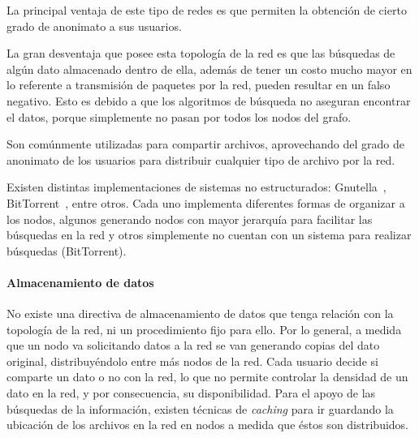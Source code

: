 La principal ventaja de este tipo de redes es que permiten la obtención de
cierto grado de anonimato a sus usuarios.

La gran desventaja que posee esta topología de la red es que las búsquedas de
algún dato almacenado dentro de ella, además de tener un costo mucho mayor en lo
referente a transmisión de paquetes por la red, pueden resultar en un falso
negativo. Esto es debido a que los algoritmos de búsqueda no aseguran encontrar
el datos, porque simplemente no pasan por todos los nodos del grafo.


Son comúnmente utilizadas para compartir archivos, aprovechando del grado de
anonimato de los usuarios para distribuir cualquier tipo de archivo por la red.

Existen distintas implementaciones de sistemas no estructurados:
Gnutella~\cite{oai:CiteSeerXPSU:10.1.1.61.7302}, 
BitTorrent~\cite{bittorrent}, 
entre otros. Cada uno implementa diferentes
formas de organizar a los nodos, algunos generando nodos con mayor jerarquía
para facilitar las búsquedas en la red y otros simplemente no cuentan con un
sistema para realizar búsquedas (BitTorrent).

\paragraph{Almacenamiento de datos}
\label{sec:p2p_unstructured_storage}

No existe una directiva de almacenamiento de datos que tenga relación con la
topología de la red, ni un procedimiento fijo para ello. Por lo general, a medida que un nodo va solicitando
datos a la red se van generando copias del dato original, distribuyéndolo
entre más nodos de la red. Cada usuario decide si comparte un dato o no con la
red, lo que no permite controlar la densidad de un dato en la red, y por
consecuencia, su disponibilidad.
Para el apoyo de las búsquedas de la información, existen técnicas de \textit{caching} para ir
guardando la ubicación de los archivos en la red en nodos a medida que éstos son
distribuidos. 


